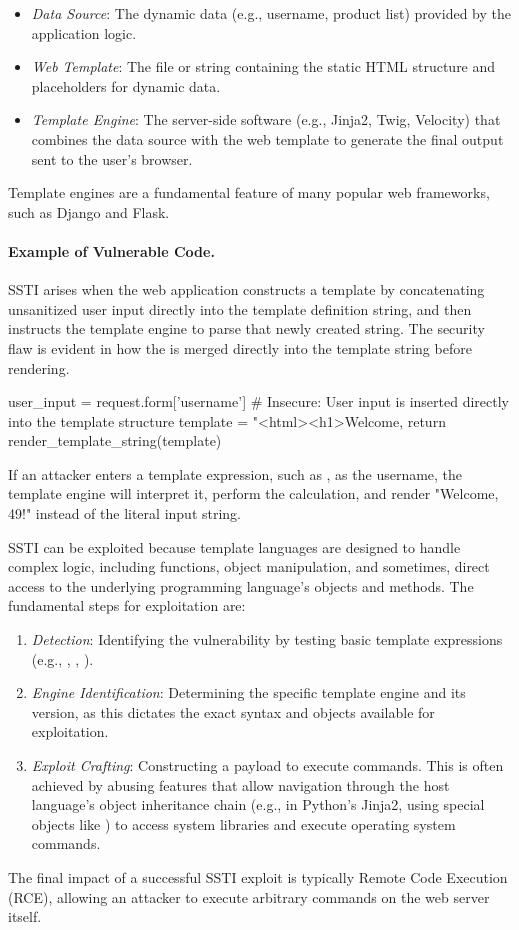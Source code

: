 \begin{itemize}
    \item \textit{Data Source}: The dynamic data (e.g., username, product list) provided by the application logic.
    \item \textit{Web Template}: The file or string containing the static HTML structure and placeholders for dynamic data.
    \item \textit{Template Engine}: The server-side software (e.g., Jinja2, Twig, Velocity) that combines the data source with the web template to generate the final output sent to the user's browser.
\end{itemize}

Template engines are a fundamental feature of many popular web frameworks, such as Django and Flask.

\paragraph{Example of Vulnerable Code.} SSTI arises when the web application constructs a template by concatenating unsanitized user input directly into the template definition string, and then instructs the template engine to parse that newly created string. The security flaw is evident in how the  is merged directly into the template string before rendering.

\begin{pythoncode}
    user_input = request.form['username']
    # Insecure: User input is inserted directly into the template structure
    template = "<html><h1>Welcome, %
    return render_template_string(template)
\end{pythoncode}

If an attacker enters a template expression, such as , as the username, the template engine will interpret it, perform the calculation, and render "Welcome, 49!" instead of the literal input string.

SSTI can be exploited because template languages are designed to handle complex logic, including functions, object manipulation, and sometimes, direct access to the underlying programming language's objects and methods. The fundamental steps for exploitation are:

\begin{enumerate}
    \item \textit{Detection}: Identifying the vulnerability by testing basic template expressions (e.g., , , ).
    \item \textit{Engine Identification}: Determining the specific template engine and its version, as this dictates the exact syntax and objects available for exploitation.
    \item \textit{Exploit Crafting}: Constructing a payload to execute commands. This is often achieved by abusing features that allow navigation through the host language's object inheritance chain (e.g., in Python's Jinja2, using special objects like ) to access system libraries and execute operating system commands.
\end{enumerate}

The final impact of a successful SSTI exploit is typically Remote Code Execution (RCE), allowing an attacker to execute arbitrary commands on the web server itself.